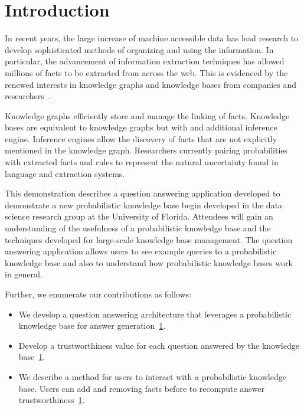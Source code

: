 

\section{Introduction}


In recent years, the large increase of machine accessible data has lead research
to develop sophisticated methods of organizing and using the information.
In particular, the advancement of information extraction techniques has allowed
millions of facts to be extracted from across the web.
This is evidenced by the renewed interests in knowledge graphs and knowledge bases
from companies and
researchers~\cite{bellare2013woo,chang2014typed,dong2014knowledge,niu2012deepdive}.

Knowledge graphs efficiently store and manage the linking of facts.
Knowledge bases are equivalent to knowledge graphs but with and additional
inference engine. 
Inference engines allow the discovery of facts that are not explicitly
mentioned in the knowledge graph.
Researchers currently pairing probabilities with extracted facts and rules to
represent the natural uncertainty found in language and extraction systems.

This demonstration describes a question answering application developed to demonstrate
a new probabilistic knowledge base begin developed in the data science research group at the University of Florida.
Attendees will gain an understanding of the usefulness of a probabilistic
knowledge base and the techniques developed for large-scale knowledge base
management.
The question answering application allows users to see example queries to a
probabilistic knowledge base and also to understand how probabilistic knowledge bases work in general.

Further, we enumerate our contributions as follows:
\begin{itemize}
\vspace{-0.5em}
\item We develop a question answering architecture that leverages a probabilistic knowledge base for answer generation~\ref{}.

\vspace{-0.5em}
\item Develop a trustworthiness value for each question answered by the knowledge base~\ref{}.

\vspace{-0.5em}
\item We describe a method for users to interact with a probabilistic knowledge
base. Users can add and removing facts before to recompute answer
trustworthiness~\ref{}.
\end{itemize}

